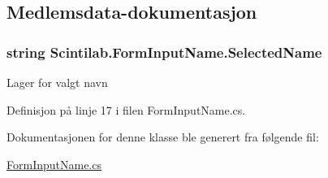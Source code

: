 \subsection{Medlemsdata-\/dokumentasjon}
\hypertarget{class_scintilab_1_1_form_input_name_aab6aee0df21ac4b5ae151806373b450c}{
\subsubsection[{Selected\+Name}]{\setlength{\rightskip}{0pt plus 5cm}string Scintilab.\+Form\+Input\+Name.\+Selected\+Name}}\label{class_scintilab_1_1_form_input_name_aab6aee0df21ac4b5ae151806373b450c}
Lager for valgt navn 

Definisjon på linje 17 i filen Form\+Input\+Name.\+cs.



Dokumentasjonen for denne klasse ble generert fra følgende fil\+:\begin{DoxyCompactItemize}
\item 
\hyperlink{_form_input_name_8cs}{Form\+Input\+Name.\+cs}\end{DoxyCompactItemize}
